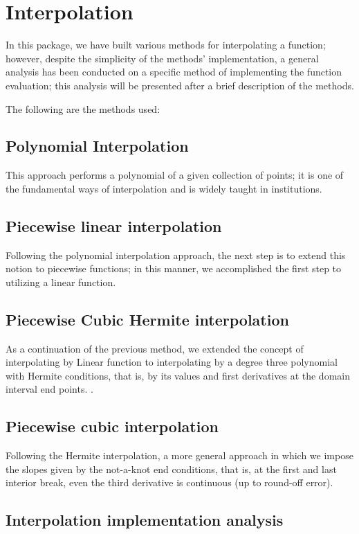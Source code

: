 \section{Interpolation}
In this package, we have built various methods for interpolating a function; however, despite the simplicity of the methods' implementation, a general analysis has been conducted on a specific method of implementing the function evaluation; this analysis will be presented after a brief description of the methods.

The following are the methods used:

\subsection{Polynomial Interpolation}
This approach performs a polynomial of a given collection of points; it is one of the fundamental ways of interpolation and is widely taught in institutions.

\subsection{Piecewise linear interpolation}
Following the polynomial interpolation approach, the next step is to extend this notion to piecewise functions; in this manner, we accomplished the first step to utilizing a linear function.

\subsection{Piecewise Cubic Hermite interpolation}
As a continuation of the previous method, we extended the concept of interpolating by Linear function to interpolating by a degree three polynomial with Hermite conditions, that is, by its values and first derivatives at the domain interval end points. \cite{kreyszig11}.

\subsection{Piecewise cubic interpolation}
Following the Hermite interpolation, a more general approach in which we impose the slopes given by the not-a-knot end conditions, that is, at the first and last interior break, even the third derivative is continuous (up to round-off error). \cite{PCHIP}
\subsection{Interpolation implementation analysis}

